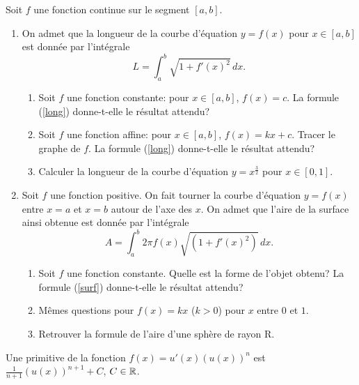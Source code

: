 \documentclass[11pt,class=report,crop=false]{standalone}
\begin{document}
\exercice{}
\enonce
Soit $f$ une fonction continue sur le segment $[a,b]$.
\begin{enumerate}
	\item On admet que la longueur de la courbe d'équation $y=f(x)$ pour $x \in [a,b]$ est donnée par l'intégrale
	\begin{equation}
	L=\int_{a}^{b} \sqrt{1+f'(x)^{2}}\,dx. \label{long}
	\end{equation}
	\begin{enumerate}
		\item Soit $f$ une fonction constante: pour $x\in[a,b]$, $f(x)=c$. La formule (\ref{long}) donne-t-elle le résultat attendu?
		\item Soit $f$ une fonction affine: pour $x\in[a,b]$, $f(x)=kx+c$. Tracer le graphe de $f$. La formule (\ref{long}) donne-t-elle le résultat attendu?
		\item Calculer la longueur de la courbe d'équation $y=x^{\frac{3}{2}}$ pour $x \in [0,1]$.
	\end{enumerate}
	\item  Soit $f$ une fonction positive. On fait tourner la courbe d'équation $y=f(x)$ entre $x=a$ et $x=b$ autour de l'axe des $x$. On admet que l'aire de la surface ainsi obtenue est donnée par l'intégrale
	\begin{equation}
	A=\int_a ^b 2\pi f(x) \sqrt {(1+f'(x) ^2)}\,dx. \label{surf}
	\end{equation}
	\begin{enumerate}
		\item Soit $f$ une fonction constante. Quelle est la forme de l'objet obtenu? La formule (\ref{surf}) donne-t-elle le résultat attendu?
		\item Mêmes questions pour $f(x)= kx$ ($k > 0$) pour $x$ entre $0$ et $1$.
		\item Retrouver la formule de l'aire d'une sphère de rayon R.
	\end{enumerate}
\end{enumerate}
\finenonce

\indication
Une primitive de la fonction $ f(x) = u'(x) (u(x))^n $ est $ \frac{1}{n+1} 
(u(x))^{n+1} + C $, $ C \in \mathbb{R} $. 
\finindication

\correction

\end{document}
